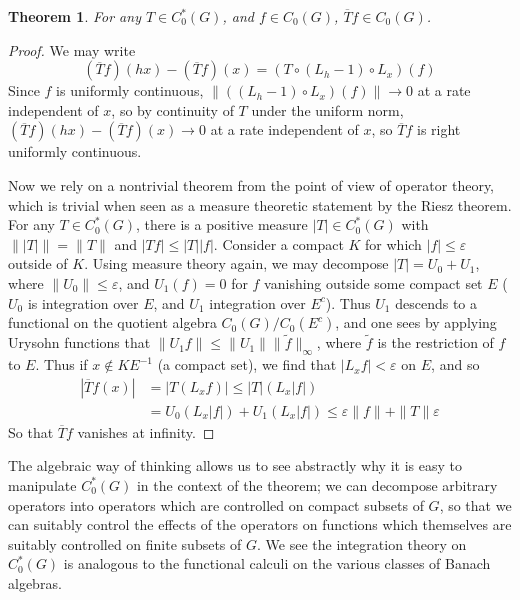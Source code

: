 \documentclass{article}
\theoremstyle{plain}
\newtheorem{theorem}{Theorem}
\theoremstyle{definition}
\begin{document}
\begin{theorem}
    For any $T \in C^*_0(G)$, and $f \in C_0(G)$, $\overline{T}f \in C_0(G)$.
\end{theorem}
\begin{proof}
    We may write
    \[ (\overline{T}f)(hx) - (\overline{T}f)(x) = (T \circ (L_h - 1) \circ L_x)(f) \]
    Since $f$ is uniformly continuous, $\| ((L_h - 1) \circ L_x) (f) \| \to 0$ at a rate independent of $x$, so by continuity of $T$ under the uniform norm, $(\overline{T}f)(hx) - (\overline{T}f)(x) \to 0$ at a rate independent of $x$, so $\overline{T}f$ is right uniformly continuous.

    Now we rely on a nontrivial theorem from the point of view of operator theory, which is trivial when seen as a measure theoretic statement by the Riesz theorem. For any $T \in C^*_0(G)$, there is a positive measure $|T| \in C^*_0(G)$ with $\| |T| \| = \| T \|$ and $|Tf| \leq |T||f|$. Consider a compact $K$ for which $|f| \leq \varepsilon$ outside of $K$. Using measure theory again, we may decompose $|T| = U_0 + U_1$, where $\| U_0 \| \leq \varepsilon$, and $U_1(f) = 0$ for $f$ vanishing outside some compact set $E$ ($U_0$ is integration over $E$, and $U_1$ integration over $E^c$). Thus $U_1$ descends to a functional on the quotient algebra $C_0(G)/C_0(E^c)$, and one sees by applying Urysohn functions that $\| U_1 f \| \leq \| U_1 \| \| \tilde{f} \|_\infty$, where $\tilde{f}$ is the restriction of $f$ to $E$. Thus if $x \not \in KE^{-1}$ (a compact set), we find that $|L_x f| < \varepsilon$ on $E$, and so
    \begin{align*}
        |\overline{T}f(x)| &= |T(L_x f)| \leq |T|(L_x |f|)\\
        &= U_0(L_x |f|) + U_1(L_x |f|) \leq \varepsilon \| f \| + \| T \| \varepsilon
    \end{align*}
    So that $\overline{T}f$ vanishes at infinity.
\end{proof}

The algebraic way of thinking allows us to see abstractly why it is easy to manipulate $C_0^*(G)$ in the context of the theorem; we can decompose arbitrary operators into operators which are controlled on compact subsets of $G$, so that we can suitably control the effects of the operators on functions which themselves are suitably controlled on finite subsets of $G$. We see the integration theory on $C^*_0(G)$ is analogous to the functional calculi on the various classes of Banach algebras.
\end{document}
